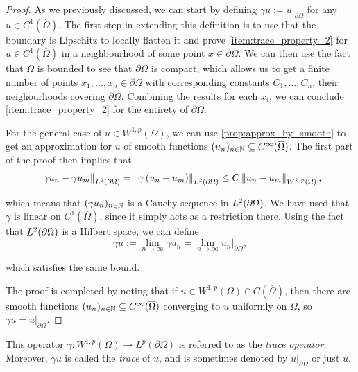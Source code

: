 \begin{proof}
    As we previously discussed, we can start by defining $\gamma u := u \vert_{\partial \Omega}$ for any $u \in C^1(\overline{\Omega})$. The first step in extending this definition is to use that the boundary is Lipschitz to locally flatten it and prove \cref{item:trace_property_2} for $u \in C^1(\overline{\Omega})$ in a neighbourhood of some point $x \in \partial \Omega$. We can then use the fact that $\Omega$ is bounded to see that $\partial \Omega$ is compact, which allows us to get a finite number of points $x_1, \dots, x_n \in \partial \Omega$ with corresponding constants $C_1, \dots, C_n$, their neighourhoods covering $\partial \Omega$. Combining the results for each $x_i$, we can conclude \cref{item:trace_property_2} for the entirety of $\partial \Omega$.

    For the general case of $u \in W^{1,p}(\Omega)$, we can use \cref{prop:approx_by_smooth} to get an approximation for $u$ of smooth functions $(u_n)_{n \in \mathbb{N}} \subseteq C^\infty(\overline{\Omega})$. The first part of the proof then implies that
%
    \begin{equation*}
        \left\| \gamma u_n - \gamma u_m \right\|_{L^2(\partial \Omega)} = \left\| \gamma \left( u_n - u_m \right) \right\|_{L^2(\partial \Omega)} \leq C \left\| u_n - u_m \right\|_{W^{k,p}(\Omega)},
    \end{equation*}

    \noindent
    which means that $(\gamma u_n)_{n \in \mathbb{N}}$ is a Cauchy sequence in $L^2(\partial \Omega)$. We have used that $\gamma$ is linear on $C^1(\overline{\Omega})$, since it simply acts as a restriction there. Using the fact that $L^2(\partial \Omega)$ is a Hilbert space, we can define
%
    \begin{equation*}
        \gamma u := \lim_{n \to \infty} \gamma u_n = \lim_{n \to \infty} u_n \vert_{\partial \Omega},
    \end{equation*}

    \noindent
    which satisfies the same bound.

    The proof is completed by noting that if $u \in W^{1,p}(\Omega) \cap C(\overline{\Omega})$, then there are smooth functions $(u_n)_{n \in \mathbb{N}} \subseteq C^\infty(\overline{\Omega})$ converging to $u$ uniformly on $\overline{\Omega}$, so $\gamma u = u \vert_{\partial \Omega}$.
\end{proof}

\begin{definition}{}{}
    This operator $\gamma: W^{1,p}(\Omega) \to L^p(\partial \Omega)$ is referred to as the \emph{trace operator}. Moreover, $\gamma u$ is called the \emph{trace} of $u$, and is sometimes denoted by $u \vert_{\partial \Omega}$ or just $u$.
\end{definition}
